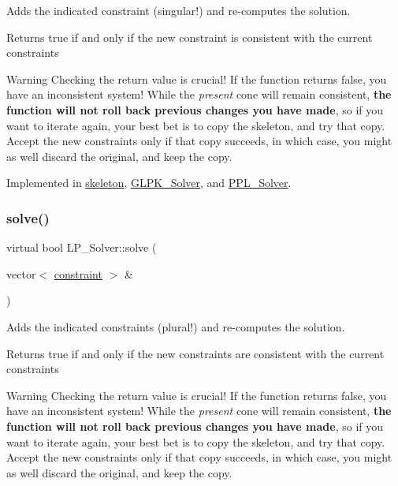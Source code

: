 Adds the indicated constraint (singular!) and re-\/computes the solution. 

\begin{DoxyReturn}{Returns}
{\ttfamily true} if and only if the new constraint is consistent with the current constraints
\end{DoxyReturn}
\begin{DoxyWarning}{Warning}
Checking the return value is crucial! If the function returns {\ttfamily false}, you have an inconsistent system! While the {\itshape present} cone will remain consistent, {\bfseries the function will not roll back previous changes you have made}, so if you want to iterate again, your best bet is to copy the skeleton, and try that copy. Accept the new constraints only if that copy succeeds, in which case, you might as well discard the original, and keep the copy. 
\end{DoxyWarning}


Implemented in \hyperlink{classskeleton_a8add1433d3bc6b1a8588f0f88134599f}{skeleton}, \hyperlink{class_g_l_p_k___solver_acb3a10f3961c65b4cf23ff61f0e2310b}{G\+L\+P\+K\+\_\+\+Solver}, and \hyperlink{class_p_p_l___solver_a1ff16def22c734348c626b65437dd1e3}{P\+P\+L\+\_\+\+Solver}.

\mbox{\label{class_l_p___solver_a35da4bdf5db971c445f495b6eaab072d}} 
\subsubsection{\texorpdfstring{solve()}{solve()}\hspace{0.1cm}{\footnotesize\ttfamily [2/2]}}
{\footnotesize\ttfamily virtual bool L\+P\+\_\+\+Solver\+::solve (\begin{DoxyParamCaption}\item[{vector$<$ \hyperlink{classconstraint}{constraint} $>$ \&}]{ }\end{DoxyParamCaption})\hspace{0.3cm}{\ttfamily [pure virtual]}}



Adds the indicated constraints (plural!) and re-\/computes the solution. 

\begin{DoxyReturn}{Returns}
{\ttfamily true} if and only if the new constraints are consistent with the current constraints
\end{DoxyReturn}
\begin{DoxyWarning}{Warning}
Checking the return value is crucial! If the function returns {\ttfamily false}, you have an inconsistent system! While the {\itshape present} cone will remain consistent, {\bfseries the function will not roll back previous changes you have made}, so if you want to iterate again, your best bet is to copy the skeleton, and try that copy. Accept the new constraints only if that copy succeeds, in which case, you might as well discard the original, and keep the copy. 
\end{DoxyWarning}


